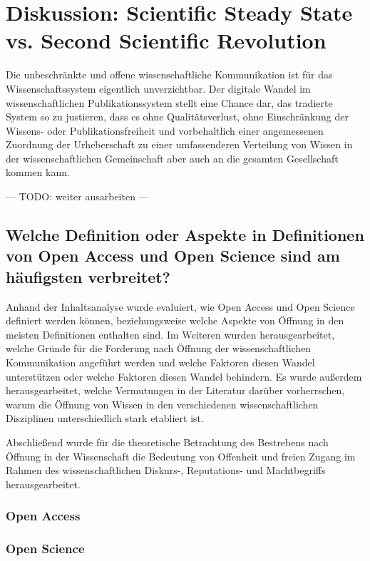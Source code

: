 \chapter{Diskussion: Scientific Steady State vs. Second Scientific Revolution}

Die unbeschränkte und offene wissenschaftliche Kommunikation ist für das Wissenschaftssystem eigentlich unverzichtbar. Der digitale Wandel im wissenschaftlichen Publikationssystem stellt eine Chance dar, das tradierte System so zu justieren, dass es ohne Qualitätsverlust, ohne Einschränkung der Wissens- oder Publikationsfreiheit und vorbehaltlich einer angemessenen Zuordnung der Urheberschaft zu einer umfassenderen Verteilung von Wissen in der wissenschaftlichen Gemeinschaft aber auch an die gesamten Gesellschaft kommen kann.

--- TODO: weiter ausarbeiten ---

\section{Welche Definition oder Aspekte in Definitionen von Open Access und Open Science sind am häufigsten verbreitet?}

Anhand der Inhaltsanalyse wurde evaluiert, wie Open Access und Open Science definiert werden können, beziehungsweise welche Aspekte von Öffnung in den meisten Definitionen enthalten sind. Im Weiteren wurden herausgearbeitet, welche Gründe für die Forderung nach Öffnung der wissenschaftlichen Kommunikation angeführt werden und welche Faktoren diesen Wandel unterstützen oder welche Faktoren diesen Wandel behindern. Es wurde außerdem herausgearbeitet, welche Vermutungen in der Literatur darüber vorherrschen, warum die Öffnung von Wissen in den verschiedenen wissenschaftlichen Disziplinen unterschiedlich stark etabliert ist.

Abschließend wurde für die theoretische Betrachtung des Bestrebens nach Öffnung in der Wissenschaft die Bedeutung von Offenheit und freien Zugang im Rahmen des wissenschaftlichen Diskurs-, Reputations- und Machtbegriffs herausgearbeitet.

\subsection{Open Access}

\subsection{Open Science}

